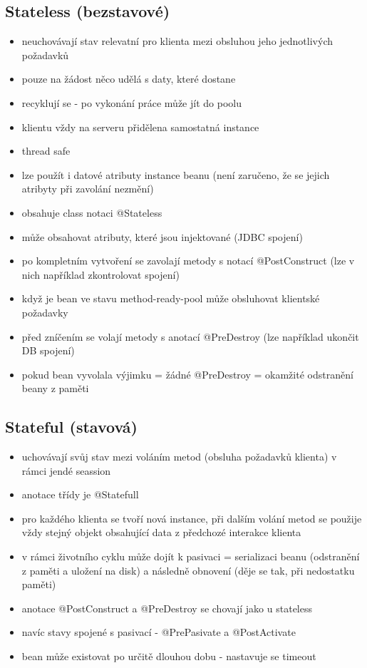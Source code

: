 \documentclass{szzclass}
\begin{document}
\subsection{Stateless (bezstavové)}
\begin{itemize}
    \item neuchovávají stav relevatní pro klienta mezi obsluhou jeho jednotlivých požadavků
    \item pouze na žádost něco udělá s daty, které dostane
    \item recyklují se - po vykonání práce může jít do poolu
    \item klientu vždy na serveru přidělena samostatná instance
    \item thread safe
    \item lze použít i datové atributy instance beanu (není zaručeno, že se jejich atribyty při zavolání nezmění)
    \item obsahuje class notaci @Stateless
    \item může obsahovat atributy, které jsou injektované (JDBC spojení)
    \item po kompletním vytvoření se zavolají metody s notací @PostConstruct (lze v nich například zkontrolovat spojení)
    \item když je bean ve stavu method-ready-pool může obsluhovat klientské požadavky
    \item před zníčením se volají metody s anotací @PreDestroy (lze například ukončit DB spojení)
    \item pokud bean vyvolala výjimku = žádné @PreDestroy = okamžité odstranění beany z paměti
\end{itemize}
\subsection{Stateful (stavová)}
\begin{itemize}
    \item uchovávají svůj stav mezi voláním metod (obsluha požadavků klienta) v rámci jendé seassion
    \item anotace třídy je @Statefull
    \item pro každého klienta se tvoří nová instance, při dalším volání metod se použije vždy stejný objekt obsahující data z předchozé interakce klienta
    \item v rámci životního cyklu může dojít k pasivaci = serializaci beanu (odstranění z paměti a uložení na disk) a následně obnovení (děje se tak, při nedostatku paměti)
    \item anotace @PostConstruct a @PreDestroy se chovají jako u stateless
    \item navíc stavy spojené s pasivací - @PrePasivate a @PostActivate
    \item bean může existovat po určitě dlouhou dobu - nastavuje se timeout
\end{itemize}
\end{document}
